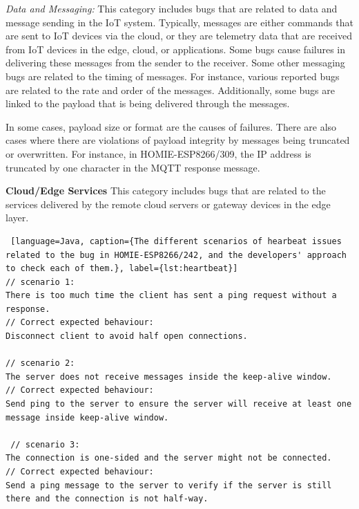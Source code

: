 \textit{Data and Messaging:}
This category includes bugs that are related to data and message sending in the IoT system. Typically, messages are either commands that are sent to IoT devices via the cloud, or they are telemetry data that are received from IoT devices in the edge, cloud, or applications. Some bugs cause failures in delivering these messages from the sender to the receiver. Some other messaging bugs are related to the timing of messages. For instance, various reported bugs are related to the rate and order of the messages. Additionally, some bugs are linked to the payload that is being delivered through the messages. 

In some cases, payload size or format are the causes of failures. There are also cases where there are violations of payload integrity by messages being truncated or overwritten. For instance, in HOMIE-ESP8266/309, the IP address is truncated by one character in the MQTT response message.


\textbf{Cloud/Edge Services}
This category includes bugs that are related to the services delivered by the remote cloud servers or gateway devices in the edge layer. 

\begin{lstlisting} [language=Java, caption={The different scenarios of hearbeat issues related to the bug in HOMIE-ESP8266/242, and the developers' approach to check each of them.}, label={lst:heartbeat}] 
// scenario 1: 
There is too much time the client has sent a ping request without a response.
// Correct expected behaviour:
Disconnect client to avoid half open connections.

// scenario 2: 
The server does not receive messages inside the keep-alive window.
// Correct expected behaviour:
Send ping to the server to ensure the server will receive at least one message inside keep-alive window.
 
 // scenario 3: 
The connection is one-sided and the server might not be connected.
// Correct expected behaviour:
Send a ping message to the server to verify if the server is still there and the connection is not half-way.
\end{lstlisting}

